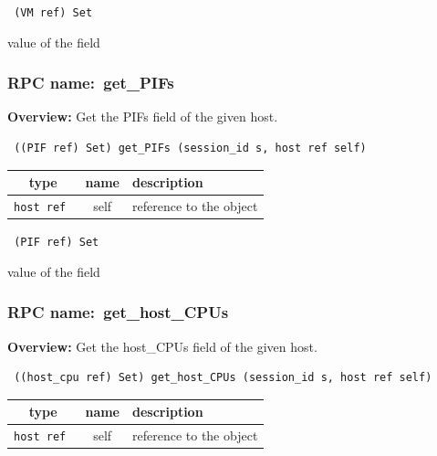 \vspace{0.3cm}

{\tt 
(VM ref) Set
}


value of the field
\vspace{0.3cm}
\vspace{0.3cm}
\vspace{0.3cm}
\subsubsection{RPC name:~get\_PIFs}

{\bf Overview:} 
Get the PIFs field of the given host.

\begin{verbatim} ((PIF ref) Set) get_PIFs (session_id s, host ref self)\end{verbatim}



 
\vspace{0.3cm}
\begin{tabular}{|c|c|p{7cm}|}
 \hline
{\bf type} & {\bf name} & {\bf description} \\ \hline
{\tt host ref } & self & reference to the object \\ \hline 

\end{tabular}

\vspace{0.3cm}

{\tt 
(PIF ref) Set
}


value of the field
\vspace{0.3cm}
\vspace{0.3cm}
\vspace{0.3cm}
\subsubsection{RPC name:~get\_host\_CPUs}

{\bf Overview:} 
Get the host\_CPUs field of the given host.

\begin{verbatim} ((host_cpu ref) Set) get_host_CPUs (session_id s, host ref self)\end{verbatim}



 
\vspace{0.3cm}
\begin{tabular}{|c|c|p{7cm}|}
 \hline
{\bf type} & {\bf name} & {\bf description} \\ \hline
{\tt host ref } & self & reference to the object \\ \hline 

\end{tabular}

